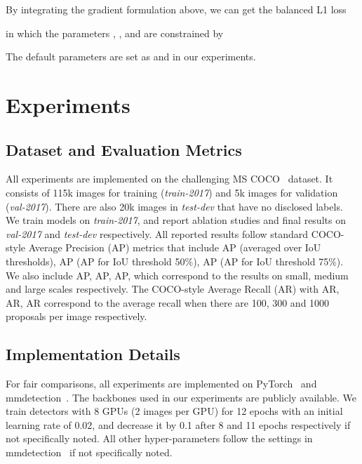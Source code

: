 \documentclass[10pt,twocolumn,letterpaper]{article}
\begin{document}
By integrating the gradient formulation above, we can get the balanced L1 loss

in which the parameters , , and  are constrained by

The default parameters are set as  and  in our experiments.
 

\section{Experiments}
\subsection{Dataset and Evaluation Metrics}
All experiments are implemented on the challenging MS COCO~\cite{coco} dataset.
It consists of 115k images for training (\emph{train-2017}) and 5k images for validation (\emph{val-2017}).
There are also 20k images in \emph{test-dev} that have no disclosed labels.
We train models on \emph{train-2017}, and report ablation studies and final results on \emph{val-2017} and \emph{test-dev} respectively.
All reported results follow standard COCO-style Average Precision (AP) metrics that include
AP (averaged over IoU thresholds), AP (AP for IoU threshold 50\%), AP (AP for IoU threshold 75\%).
We also include AP, AP, AP, which correspond to the results on small, medium and large scales respectively.
The COCO-style Average Recall (AR) with AR, AR, AR correspond to the average recall when there are 100, 300 and 1000 proposals per image respectively.

\subsection{Implementation Details}
For fair comparisons, all experiments are implemented on PyTorch~\cite{pytorch} and mmdetection~\cite{mmdetection2018}.
The backbones used in our experiments are publicly available.
We train detectors with 8 GPUs (2 images per GPU) for 12 epochs with an initial learning rate of 0.02, and decrease it by 0.1 after 8 and 11 epochs respectively if not specifically noted.
All other hyper-parameters follow the settings in mmdetection~\cite{mmdetection2018} if not specifically noted.
\end{document}
